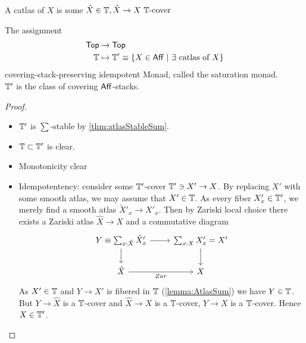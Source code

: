 \begin{definition}
	A catlas of $X$ is  some $\hat X \in \mathbb{T} , \hat X \to X \text{ $\mathbb{T}$-cover }$
\end{definition}
\begin{prop}
	The assignment
		\begin{align*}
		\operatorname{\mathsf{Top}} &\to \operatorname{\mathsf{Top}} \\
		\mathbb{T} &\mapsto \mathbb{T}' \equiv \{X \in \mathsf{Aff} \ | \  \exists \text{ catlas of } X \}
		\end{align*}
	covering-stack-preserving idempotent Monad, called the saturation monad. \\
	 $\mathbb{T}'$ is the class of covering $\mathsf{Aff}$-stacks.
\end{prop}
\begin{proof}
	\begin{itemize}
		\item 	$\mathbb{T}'$ is $\sum$-stable by \ref{thm:atlasStableSum}. \\
		\item $\mathbb{T} \subset \mathbb{T}'$ is clear.
		\item Monotonicity clear
		\item Idempotentency:  consider some $\mathbb{T}'$-cover $\mathbb{T}' \ni X' \to X$. By replacing $X'$ with some smooth atlas, we may assume that $X' \in \mathbb{T}$. As every fiber $X'_x \in \mathbb{T}'$, we merely find a smooth atlas $\tilde X'_x \to X'_x$. Then by Zariski local choice there exists a Zariski atlas $\hat X \to X$ and a commutative diagram 
	\[\begin{tikzcd}
		Y \equiv {\sum_{x : \hat X}\tilde X'_x} & {\sum_{x : X}X'_x} = X' \\
		{\hat X} & X
		\arrow[from=1-1, to=1-2]
		\arrow[from=1-1, to=2-1]
		\arrow[from=1-2, to=2-2]
		\arrow["Zar"', from=2-1, to=2-2]
	\end{tikzcd}\]
	As $X' \in \mathbb{T}$ and $Y \to X'$ is fibered in $\mathbb{T}$ (\ref{lemma:AtlasSum}) we have $Y \in \mathbb{T}$. But $Y \to \hat X$ is a $\mathbb{T}$-cover and $\hat X \to X$ is a $\mathbb{T}$-cover, $Y \to X$ is a $\mathbb{T}$-cover. Hence $X \in \mathbb{T}'$.


\end{itemize}
\end{proof}
